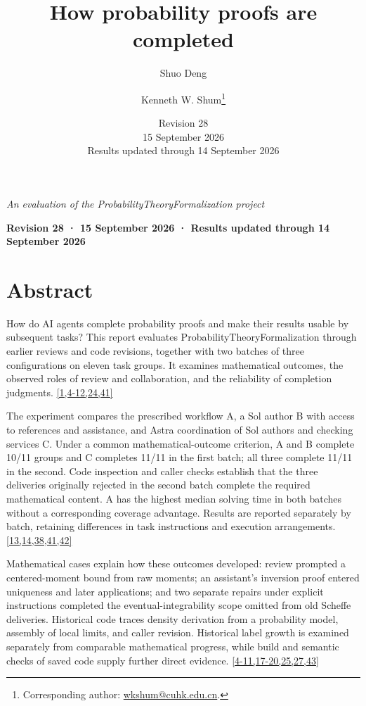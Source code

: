
\title{How probability proofs are completed}
\author{Shuo Deng \and Kenneth W. Shum\thanks{Corresponding author: \href{mailto:wkshum@cuhk.edu.cn}{wkshum@cuhk.edu.cn}.}}\date{Revision 28\\15 September 2026\\Results updated through 14 September 2026}
\maketitle
\emph{An evaluation of the ProbabilityTheoryFormalization project}

\textbf{Revision 28 · 15 September 2026 · Results updated through 14 September 2026}

\section*{\texorpdfstring{\protect\hypertarget{abstract}{}Abstract}{Abstract}}
How do AI agents complete probability proofs and make their results usable by subsequent tasks? This report evaluates ProbabilityTheoryFormalization through earlier reviews and code revisions, together with two batches of three configurations on eleven task groups. It examines mathematical outcomes, the observed roles of review and collaboration, and the reliability of completion judgments. \hyperlink{ref-1}{\mbox{[1,4-12,24,41]}}

The experiment compares the prescribed workflow A, a Sol author B with access to references and assistance, and Astra coordination of Sol authors and checking services C. Under a common mathematical-outcome criterion, A and B complete 10/11 groups and C completes 11/11 in the first batch; all three complete 11/11 in the second. Code inspection and caller checks establish that the three deliveries originally rejected in the second batch complete the required mathematical content. A has the highest median solving time in both batches without a corresponding coverage advantage. Results are reported separately by batch, retaining differences in task instructions and execution arrangements. \hyperlink{ref-13}{\mbox{[13,14,38,41,42]}}

Mathematical cases explain how these outcomes developed: review prompted a centered-moment bound from raw moments; an assistant's inversion proof entered uniqueness and later applications; and two separate repairs under explicit instructions completed the eventual-integrability scope omitted from old Scheffe deliveries. Historical code traces density derivation from a probability model, assembly of local limits, and caller revision. Historical label growth is examined separately from comparable mathematical progress, while build and semantic checks of saved code supply further direct evidence. \hyperlink{ref-4}{\mbox{[4-11,17-20,25,27,43]}}

